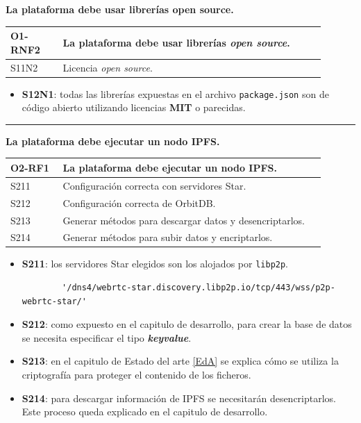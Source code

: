 \textbf{La plataforma debe usar librerías open source.}
\begin{center}
    \begin{table}[H]
        \begin{tabular}{|p{0.15\linewidth} | p{0.75\linewidth}|}
            \hline
             
            \textbf{O1-RNF2} & \textbf{La plataforma debe usar librerías \textit{open source}.} \\
            \hline
            S11N2            & Licencia \textit{open source}. \\
            \hline
        \end{tabular}
    \end{table}
\end{center}
\begin{itemize}
    \item \textbf{S12N1}: todas las librerías expuestas en el archivo \verb|package.json| son de código abierto utilizando licencias \textbf{MIT} \cite{web:mit} o parecidas.
\end{itemize}
\noindent\rule{\textwidth}{0.4pt}
\textbf{La plataforma debe ejecutar un nodo IPFS.}
\begin{center}
    \begin{table}[H]
        \begin{tabular}{|p{0.15\linewidth} | p{0.75\linewidth}|}
            \hline
             
            \textbf{O2-RF1} & \textbf{La plataforma debe ejecutar un nodo IPFS.} \\
            \hline
            S211     & Configuración correcta con servidores Star. \\
            \hline
            S212     & Configuración correcta de OrbitDB. \\
            \hline
            S213     & Generar métodos para descargar datos y desencriptarlos. \\
            \hline
            S214     & Generar métodos para subir datos y encriptarlos. \\
            \hline
        \end{tabular}
    \end{table}
\end{center}
\begin{itemize}
    \item \textbf{S211}: los servidores Star elegidos son los alojados por \verb|libp2p|.
    \begin{lstlisting}
        '/dns4/webrtc-star.discovery.libp2p.io/tcp/443/wss/p2p-webrtc-star/'
    \end{lstlisting}
    \item \textbf{S212}: como expuesto en el capitulo de desarrollo, para crear la base de datos se necesita especificar el tipo \textbf{\textit{keyvalue}}.
    \item \textbf{S213}: en el capitulo de Estado del arte \ref{EdA} se explica cómo se utiliza la criptografía para proteger el contenido de los ficheros.
    \item \textbf{S214}: para descargar información de IPFS se necesitarán desencriptarlos. Este proceso queda explicado en el capitulo de desarrollo.
\end{itemize}

